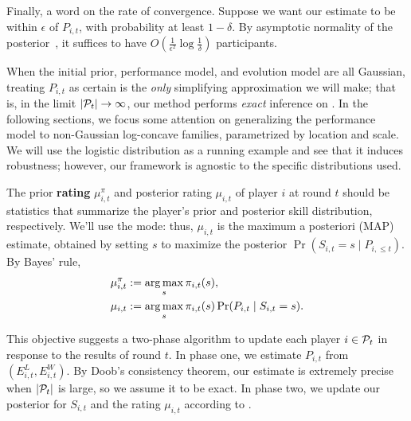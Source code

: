 Finally, a word on the rate of convergence. Suppose we want our estimate to be within $\epsilon$ of $P_{i,t}$, with probability at least $1-\delta$. By asymptotic normality of the posterior~\cite{F63}, it suffices to have $O(\frac 1{\epsilon^2}\log \frac 1\delta)$ participants.

When the initial prior, performance model, and evolution model are all Gaussian, treating $P_{i,t}$ as certain is the \emph{only} simplifying approximation we will make; that is, in the limit $|\mathcal{P}_t|\rightarrow\infty$, our method performs \emph{exact} inference on . In the following sections, we focus some attention on generalizing the performance model to non-Gaussian log-concave families, parametrized by location and scale. We will use the logistic distribution as a running example and see that it induces robustness; however, our framework is agnostic to the specific distributions used.%

The prior \textbf{rating} $\mu^\pi_{i,t}$ and posterior rating $\mu_{i,t}$ of player $i$ at round $t$ should be statistics that summarize the player's prior and posterior skill distribution, respectively. We'll use the mode: thus, $\mu_{i,t}$ is the maximum a posteriori (MAP) estimate, obtained by setting $s$ to maximize the posterior $\Pr(S_{i,t}=s \mid P_{i,\le t})$. By Bayes' rule,
\begin{align}
\label{eq:new-obj}
\mu_{i,t}^\pi &:= \operatorname*{arg\,max}_{s} \pi_{i,t}(s), \nonumber
\\\mu_{i,t} &:= \operatorname*{arg\,max}_{s} \pi_{i,t}(s) \Pr(P_{i,t} \mid S_{i,t}=s).
\end{align}

This objective suggests a two-phase algorithm to update each player $i\in\mathcal{P}_t$ in response to the results of round $t$. In phase one, we estimate $P_{i,t}$ from $(E^L_{i,t}, E^W_{i,t})$. By Doob's consistency theorem, our estimate is extremely precise when $|\mathcal{P}_t|$ is large, so we assume it to be exact. In phase two, we update our posterior for $S_{i,t}$ and the rating $\mu_{i,t}$ according to .

